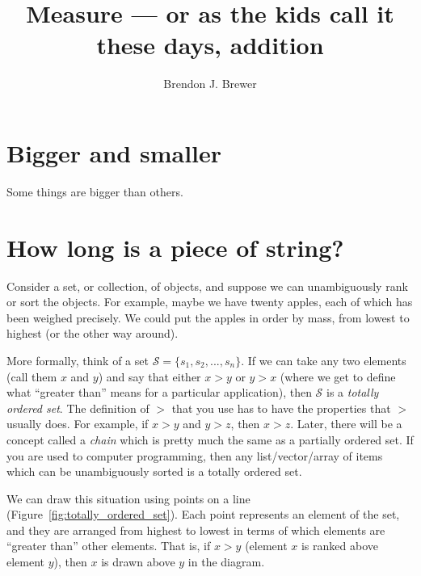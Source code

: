 \documentclass[a4paper, 12pt]{article}
\title{Measure --- or as the kids call it these days, addition}
\author{Brendon J. Brewer}
\date{}
\begin{document}
\maketitle

\setlength{\parindent}{0pt}
\setlength{\parskip}{8pt}

\section{Bigger and smaller}
Some things are bigger than others.

\section{How long is a piece of string?}

Consider a set, or collection, of objects, and suppose we can
unambiguously rank or sort the objects. For example, maybe we
have twenty apples, each of which has been weighed precisely.
We could put the apples in order by mass, from lowest to highest (or
the other way around).

More formally, think of a set $\mathcal{S} = \{s_1, s_2, ..., s_n\}$.
If we can take any two elements
(call them $x$ and $y$) and say that either $x > y$ or $y > x$ (where
we get to define what ``greater than'' means for a particular application),
then $\mathcal{S}$ is a {\em totally ordered set}. The definition of
$>$ that you use has to have the properties that $>$ usually does. For
example, if $x > y$ and $y > z$, then $x > z$. 
Later, there will be a concept called a {\em chain} which is pretty much
the same as a partially ordered set.
If you are used to computer programming, then any
list/vector/array of items which can be unambiguously sorted
is a totally ordered set.

We can draw this situation using points on a line
(Figure~\ref{fig:totally_ordered_set}).
Each point
represents an element of the set, and they are arranged from highest
to lowest in terms of which elements are ``greater than'' other elements.
That is, if $x > y$ (element
$x$ is ranked above element $y$), then $x$ is drawn above $y$ in the
diagram.
\end{document}
